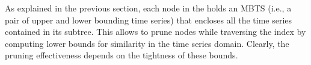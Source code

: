 
As explained in the previous section, each node in the \tsr holds an MBTS (i.e., a pair of upper and lower bounding time series) that encloses all the time series contained in its subtree. This allows to prune nodes while traversing the index by computing lower bounds for similarity in the time series domain. Clearly, the pruning effectiveness depends on the tightness of these bounds.



